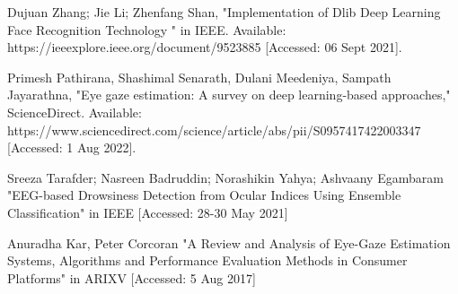 \documentclass[letterpaper, 10 pt, conference]{ieeeconf}  %
\begin{document}
\begin{thebibliography}{99}

\bibitem {}  Dujuan Zhang; Jie Li; Zhenfang Shan, "Implementation of Dlib Deep Learning Face Recognition Technology
" in IEEE. Available: https://ieeexplore.ieee.org/document/9523885 [Accessed: 06 Sept 2021].

\bibitem {}  Primesh Pathirana, Shashimal Senarath, Dulani Meedeniya, Sampath Jayarathna, "Eye gaze estimation: A survey on deep learning-based approaches," ScienceDirect. Available: https://www.sciencedirect.com/science/article/abs/pii/S0957417422003347 [Accessed: 1 Aug 2022].

\bibitem {}  Sreeza Tarafder; Nasreen Badruddin; Norashikin Yahya; Ashvaany Egambaram "EEG-based Drowsiness Detection from Ocular Indices Using Ensemble Classification" in IEEE [Accessed: 28-30 May 2021]

\bibitem {} Anuradha Kar, Peter Corcoran "A Review and Analysis of Eye-Gaze Estimation Systems, Algorithms and Performance Evaluation Methods in Consumer Platforms" in ARIXV [Accessed: 5 Aug 2017]


\end{thebibliography}
\end{document}
